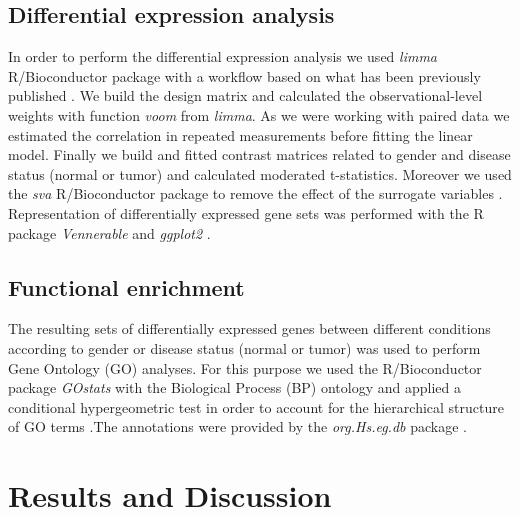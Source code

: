 \documentclass[9pt,twocolumn,twoside]{gsajnl}
\begin{document}
\subsection*{Differential expression analysis}
In order to perform the differential expression analysis we used \textit{limma} R/Bioconductor package with a workflow based on what has been previously published \citep{limma}. We build the design matrix and calculated the observational-level weights with function \textit{voom} from \textit{limma}. As we were working with paired data we estimated the correlation in repeated measurements before fitting the linear model. Finally we build and fitted contrast matrices related to gender and disease status (normal or tumor) and calculated moderated t-statistics. Moreover we used the \textit{sva} R/Bioconductor package to remove the effect of the surrogate variables \citep{sva}. Representation of differentially expressed gene sets was performed with the R package \textit{Vennerable} \citep{Venn} and \textit{ggplot2} \citep{ggplot2}.

\subsection*{Functional enrichment}
The resulting sets of differentially expressed genes between different conditions according to gender or disease status (normal or tumor) was used to perform Gene Ontology (GO) analyses. For this purpose we used the R/Bioconductor package \textit{GOstats} with the Biological Process (BP) ontology and applied a conditional hypergeometric test in order to account for the hierarchical structure of GO terms \citep{Gostats}.The annotations were provided by the \textit{org.Hs.eg.db} package \citep{org}. 


\section*{Results and Discussion}
\end{document}
